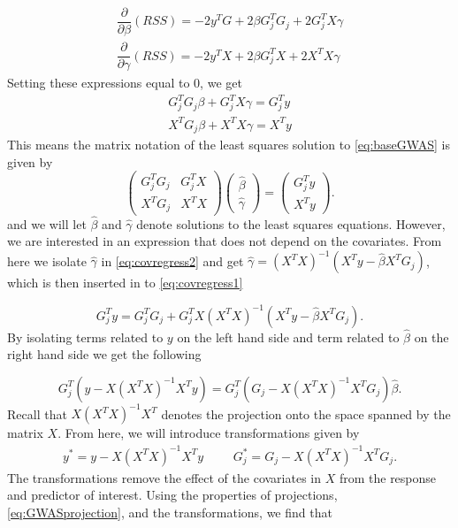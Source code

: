 \begin{align}
\dfrac{\partial}{\partial \beta} (RSS) = -2y^TG + 2\beta G_j^TG_j + 2G_j^T X\gamma \\
\dfrac{\partial}{\partial \gamma} (RSS)  = -2y^TX + 2\beta G^T_j X + 2X^TX\gamma 
\end{align}
Setting these expressions equal to $ 0 $, we get
\begin{align}
G_j^T G_j \beta +  G_j^T X \gamma =  G_j^T y  \label{eq:covregress1}\\ 
X^T G_j \beta + X^T X \gamma =  X^Ty \label{eq:covregress2}
\end{align}
This means the matrix notation of the least squares solution to \cref{eq:baseGWAS} is given by 
\begin{equation}
\begin{pmatrix}
G_j^T G_j & G_j^T X \\
X^T G_j & X^T X
\end{pmatrix}
\begin{pmatrix}
\hat{\beta} \\
\hat{\gamma}
\end{pmatrix} = 
\begin{pmatrix}
G_j^T y \\
X^T y
\end{pmatrix}.
\end{equation}
and we will let $ \hat{\beta} $ and $ \hat{\gamma} $ denote solutions to the least squares equations. However, we are interested in an expression that does not depend on the covariates. From here we isolate $ \hat{\gamma} $ in \cref{eq:covregress2} and get $ \hat{\gamma} = (X^TX)^{-1}(X^Ty - \hat{\beta} X^TG_j) $, which is then inserted in to \cref{eq:covregress1} 

\begin{equation}
G^T_j y = G_j^TG_j + G_j^TX (X^TX)^{-1}(X^Ty - \hat{\beta} X^TG_j).
\end{equation}
By isolating terms related to $ y $ on the left hand side and term related to $ \hat{\beta} $ on the right hand side we get the following

\begin{equation} \label{eq:GWASprojection}
G_j^T(y - X(X^TX)^{-1}X^Ty) = G_j^T(G_j - X(X^TX)^{-1}X^TG_j) \hat{\beta}.
\end{equation}
Recall that $ X(X^TX)^{-1}X^T $ denotes the projection onto the space spanned by the matrix $ X $. From here, we will introduce transformations given by 
\begin{align}
	y^\ast = y - X(X^TX)^{-1}X^Ty & & & G_j^{\ast} = G_j - X(X^TX)^{-1}X^TG_j.
\end{align}
The transformations remove the effect of the covariates in $ X $ from the response and predictor of interest. Using the properties of projections, \cref{eq:GWASprojection}, and the transformations, we find that 

